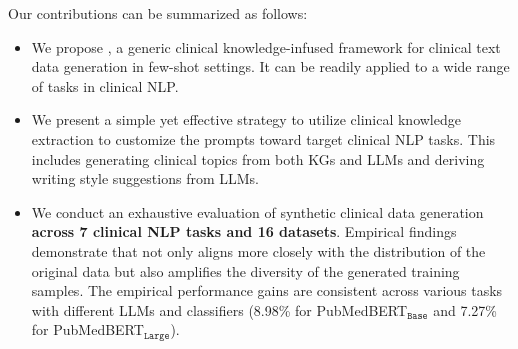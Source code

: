 
Our contributions can be summarized as follows:
\begin{itemize}[leftmargin=0.5cm]
    \item We propose {\ours}, a generic clinical knowledge-infused framework for clinical text data generation in few-shot settings. It can be readily applied to a wide range of tasks in clinical NLP.
    \item We present a simple yet effective strategy to utilize clinical knowledge extraction to customize the prompts toward target clinical NLP tasks. This includes generating clinical topics from both KGs and LLMs and deriving writing style suggestions from LLMs. 
    \item We conduct an exhaustive evaluation of synthetic clinical data generation \textbf{across 7 clinical NLP tasks and 16 datasets}. Empirical findings demonstrate that {\ours} not only aligns more closely with the distribution of the original data but also amplifies the diversity of the generated training samples. The empirical performance gains are consistent across various tasks with different LLMs and classifiers (8.98\% for PubMedBERT$_{\texttt{Base}}$ and 7.27\% for PubMedBERT$_{\texttt{Large}}$).
\end{itemize}











